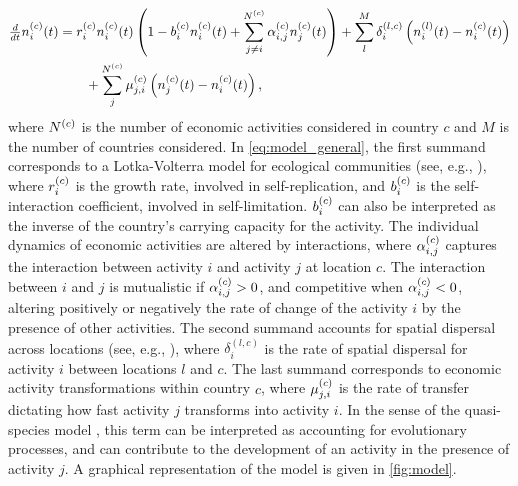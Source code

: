 \begin{equation}\label{eq:model_general}
  \begin{split}
    \tfrac{d}{dt} n_i^{(c)}(t)  &= r_i^{(c)}  n_i^{(c)}(t) \left(1 -   b_i^{(c)}  n_i^{(c)}(t)  + \sum_{j \neq i}^{N^{(c)}} \alpha^{(c)} _{i,j} n_j^{(c)}(t) \right) + \sum_l^M \delta^{(l,c)}_{i} \left( n_i^{(l)}(t) - n_i^{(c)}(t)  \right) \\
    &\qquad + \sum_j^{N^{(c)}} \mu^{(c)} _{j,i}\left( n_j^{(c)}(t)  - n_i^{(c)}(t)  \right),
  \end{split}
\end{equation}
where $N^{(c)}$ is the number of economic activities considered in country $c$ and $M$ is the number of countries considered.
% 
In \cref{eq:model_general}, the first summand corresponds to a Lotka-Volterra model for ecological communities (see, e.g., \cite{Bunin2017,Scheffer2006a,Case1990}), where  $r_i^{(c)} $ is the growth rate, involved in self-replication, and $b_i^{(c)} $ is the self-interaction coefficient, involved in self-limitation. $b_i^{(c)} $ can also be interpreted as the inverse of the country's carrying capacity for the activity. %
%
The individual dynamics of economic activities are altered by interactions, where $\alpha_{i,j}^{(c)} $ captures the interaction between activity $ i $ and activity $ j $ at location $c$. The interaction between $i$ and $j$ is mutualistic if $\alpha_{i,j}^{(c)}  > 0$, and competitive when $\alpha_{i,j}^{(c)}  < 0$, altering positively or negatively the rate of change of the activity $i$ by the presence of other activities.
%
The second summand accounts for spatial dispersal across locations (see, e.g., \cite{Tilman1994b}), where $\delta^{(l,c)}_{i}$ is the rate of spatial dispersal for activity $i$ between locations $l$ and $c$.
% 
The last summand corresponds to economic activity transformations within country $c$, where $\mu^{(c)} _{j,i}$ is the rate of transfer dictating how fast activity $j$ transforms into activity $i$. In the sense of the quasi-species model \citep{eigen1988molecular}, this term can be interpreted as accounting for evolutionary processes, and can contribute to the development of an activity in the presence of activity $j$.
%
A graphical representation of the model is given in \cref{fig:model}.

